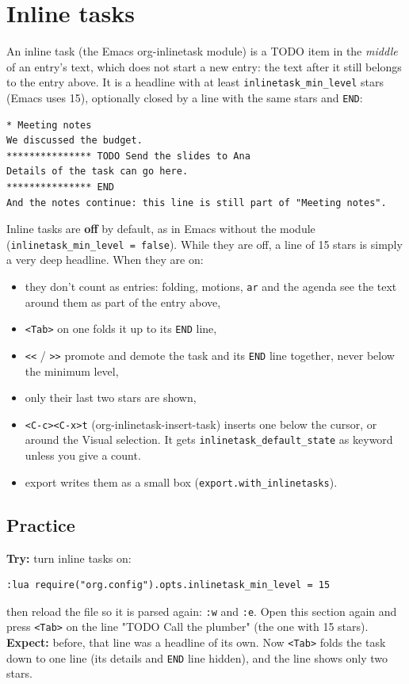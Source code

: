 \section{Inline tasks}
\label{sec:org9b58fed}
An inline task (the Emacs org-inlinetask module) is a TODO item in the
\emph{middle} of an entry's text, which does not start a new entry: the text
after it still belongs to the entry above. It is a headline with at least
\texttt{inlinetask\_min\_level} stars (Emacs uses 15), optionally closed by a line
with the same stars and \texttt{END}:

\begin{verbatim}
* Meeting notes
We discussed the budget.
*************** TODO Send the slides to Ana
Details of the task can go here.
*************** END
And the notes continue: this line is still part of "Meeting notes".
\end{verbatim}

Inline tasks are \textbf{off} by default, as in Emacs without the module
(\texttt{inlinetask\_min\_level = false}). While they are off, a line of 15 stars
is simply a very deep headline. When they are on:

\begin{itemize}
\item they don't count as entries: folding, motions, \texttt{ar} and the agenda see
the text around them as part of the entry above,
\item \texttt{<Tab>} on one folds it up to its \texttt{END} line,
\item \texttt{<{}<{}} / \texttt{>{}>{}} promote and demote the task and its \texttt{END} line together,
never below the minimum level,
\item only their last two stars are shown,
\item \texttt{<C-c><C-x>t} (org-inlinetask-insert-task) inserts one below the
cursor, or around the Visual selection. It gets
\texttt{inlinetask\_default\_state} as keyword unless you give a count.
\item export writes them as a small box (\texttt{export.with\_inlinetasks}).
\end{itemize}
\subsection{Practice}
\label{sec:org99af24e}
\textbf{Try:} turn inline tasks on:
\begin{verbatim}
:lua require("org.config").opts.inlinetask_min_level = 15
\end{verbatim}
then reload the file so it is parsed again: \texttt{:w} and \texttt{:e}.
Open this section again and press \texttt{<Tab>} on the line "TODO Call the
plumber" (the one with 15 stars).
\textbf{Expect:} before, that line was a headline of its own. Now \texttt{<Tab>} folds
the task down to one line (its details and \texttt{END} line hidden), and the
line shows only two stars.

